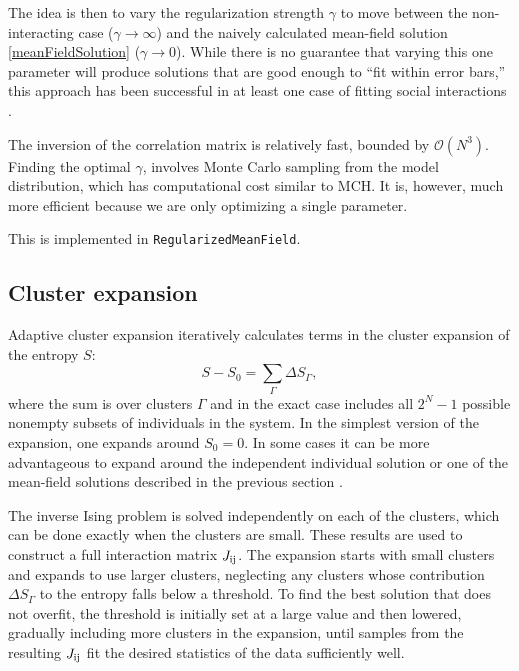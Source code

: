 \documentclass[aps,prl,twocolumn,nofootinbib]{revtex4-1}
\begin{document}
The idea is then to vary the regularization strength $\gamma$ to move between the
non-interacting case ($\gamma \rightarrow \infty$) and the naively calculated
mean-field solution \eqref{meanFieldSolution} ($\gamma \rightarrow 0$).
While there is no guarantee that varying this one parameter will produce solutions that are
good enough to ``fit within error bars,'' this approach has been successful in at least
one case of fitting social interactions \cite{Daniels:2017cq}.

The inversion of the correlation matrix is relatively fast, bounded by $\mathcal{O}(N^3)$. Finding the optimal $\gamma$, involves Monte Carlo sampling from the model distribution, which has computational cost similar to MCH. It is, however, much more efficient because we are only optimizing a single parameter.

This is implemented in {\tt RegularizedMeanField}.



\subsection{Cluster expansion}

Adaptive cluster expansion \cite{Monasson:2011fo,CocMon12,BarCoc13}
iteratively calculates terms in the
cluster expansion of the entropy $S$:
\begin{equation}
S - S_0 = \sum_\Gamma \Delta S_\Gamma,
\end{equation}
where the sum is over clusters $\Gamma$ and in the exact case
includes all $2^N - 1$ possible nonempty subsets of individuals in the system.  In the simplest version of the expansion,
one expands around $S_0 = 0$.  In some cases it can be more advantageous to
expand around
the independent individual solution or one of the mean-field solutions
described in the previous section \cite{BarCoc13}.

The inverse Ising problem is solved independently
on each of the clusters, which can be done exactly when the
clusters are small.  These results are used to construct a full
interaction matrix $J_{\rm ij}$.
The expansion starts with small clusters and expands to use larger
clusters, neglecting any clusters whose
contribution $\Delta S_\Gamma$ to the entropy falls below a threshold.
To find the best solution that does not overfit,
the threshold is initially set at a large value and then lowered,
gradually including more clusters in the expansion, until samples from
the resulting $J_{\rm ij}$ fit the desired statistics of the data sufficiently well.
\end{document}
